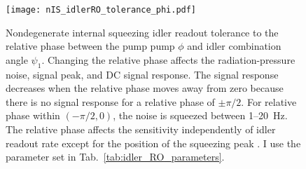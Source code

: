 \begin{figure}
    \centering
    \texttt{[image: nIS\_idlerRO\_tolerance\_phi.pdf]}
    \caption{ Nondegenerate internal squeezing idler readout tolerance to the relative phase between the pump pump $\phi$ and idler combination angle $\psi_1$. Changing the relative phase affects the radiation-pressure noise, signal peak, and DC signal response. The signal response decreases when the relative phase moves away from zero because there is no signal response for a relative phase of $\pm\pi/2$. For relative phase within $(-\pi/2,0)$, the noise is squeezed between 1--20~Hz. The relative phase affects the sensitivity independently of idler readout rate  except for the position of the squeezing peak . I use the parameter set in Tab.~\ref{tab:idler_RO_parameters}.}
    \label{fig:nIS_idlerRO_tolerance_phi}
\end{figure}

